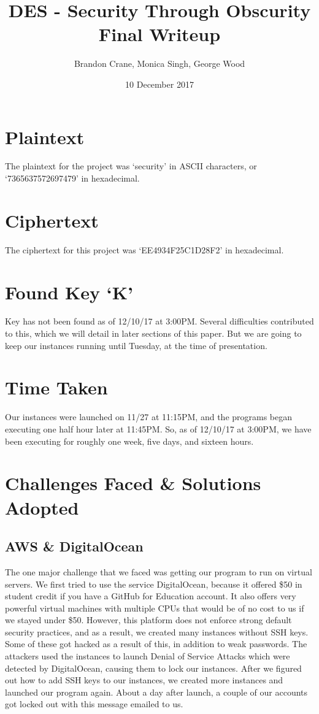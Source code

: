\documentclass{article}
\title{DES - Security Through Obscurity Final Writeup}
\author{Brandon Crane, Monica Singh, George Wood}
\date{10 December 2017}
\begin{document}
\maketitle

\thispagestyle{empty}

\section{Plaintext}
The plaintext for the project was `security' in ASCII characters, or \newline `7365637572697479' in hexadecimal.
\section{Ciphertext}
The ciphertext for this project was `EE4934F25C1D28F2' in hexadecimal.
\section{Found Key `K'}
Key has not been found as of 12/10/17 at 3:00PM. Several difficulties contributed to this, which we will detail in later sections of this paper. But we are going to keep our instances running until Tuesday, at the time of presentation.
\section{Time Taken}
Our instances were launched on 11/27 at 11:15PM, and the programs began executing one half hour later at 11:45PM. So, as of 12/10/17 at 3:00PM, we have been executing for roughly one week, five days, and sixteen hours.
\section{Challenges Faced \& Solutions Adopted}
\subsection{AWS \& DigitalOcean}
The one major challenge that we faced was getting our program to run on virtual servers. We first tried to use the service DigitalOcean, because it offered \$50 in student credit if you have a GitHub for Education account. It also offers very powerful virtual machines with multiple CPUs that would be of no cost to us if we stayed under \$50. However, this platform does not enforce strong default security practices, and as a result, we created many instances without SSH keys. Some of these got hacked as a result of this, in addition to weak passwords. The attackers used the instances to launch Denial of Service Attacks which were detected by DigitalOcean, causing them to lock our instances. After we figured out how to add SSH keys to our instances, we created more instances and launched our program again. About a day after launch, a couple of our accounts got locked out with this message emailed to us.
\end{document}
